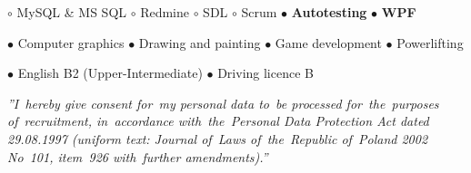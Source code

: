 \documentclass[11pt,a4paper]{article}
\begin{document}
    \vspace{0.04cm}
    $\circ$ MySQL \& MS SQL
    \hspace{0.34cm}
    $\circ$ Redmine
    \hspace{0.34cm}
    $\circ$ SDL
    \hspace{0.34cm}
    $\circ$ Scrum
    \hspace{0.34cm}
    $\bullet$ {\bf Autotesting}
    \hspace{0.34cm}
    $\bullet$ {\bf WPF}


    \bigskip


    \smallskip
    $\bullet$ Computer graphics
    \hspace{0.34cm}
    $\bullet$ Drawing and painting
    \hspace{0.34cm}
    $\bullet$ Game development
    \hspace{0.34cm}
    $\bullet$ Powerlifting


    \bigskip


    \smallskip
    $\bullet$ English B2 (Upper-Intermediate)
    \hspace{0.34cm}
    $\bullet$ Driving licence B


    \vspace{1cm}

    \noindent \textit{''I~hereby give consent for~my personal data to~be processed for~the~purposes of~recruitment,
    in~accordance with~the~Personal Data Protection Act dated 29.08.1997 (uniform text: Journal of~Laws of~the~Republic
    of~Poland 2002 No~101, item~926 with~further amendments).''}
\end{document}
